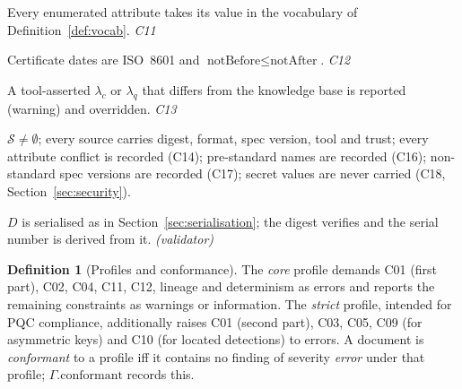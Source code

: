 \documentclass[11pt,a4paper]{article}
\newcommand{\Srcs}{\mathcal{S}}
\theoremstyle{definition}
\newtheorem{definition}{Definition}[section]
\theoremstyle{plain}
\begin{document}
\setcounter{constraint}{10}
\begin{constraint}
Every enumerated attribute takes its value in the vocabulary of Definition~\ref{def:vocab}. \hfill\emph{C11}
\end{constraint}
\setcounter{constraint}{11}
\begin{constraint}
Certificate dates are ISO~8601 and $\text{notBefore} \le \text{notAfter}$. \hfill\emph{C12}
\end{constraint}
\setcounter{constraint}{12}
\begin{constraint}
A tool-asserted $\lambda_c$ or $\lambda_q$ that differs from the knowledge base is reported
(warning) and overridden. \hfill\emph{C13}
\end{constraint}
\setcounter{constraint}{13}
\begin{constraint}[Lineage]
$\Srcs \ne \emptyset$; every source carries digest, format, spec version, tool and trust; every
attribute conflict is recorded (C14); pre-standard names are recorded (C16); non-standard spec
versions are recorded (C17); secret values are never carried (C18, Section~\ref{sec:security}).
\end{constraint}
\setcounter{constraint}{20}
\begin{constraint}[Determinism]
$D$ is serialised as in Section~\ref{sec:serialisation}; the digest verifies and the serial
number is derived from it. \hfill\emph{(validator)}
\end{constraint}

\begin{definition}[Profiles and conformance]
The \emph{core} profile demands C01 (first part), C02, C04, C11, C12, lineage and determinism as
errors and reports the remaining constraints as warnings or information. The \emph{strict}
profile, intended for PQC compliance, additionally raises C01 (second part), C03, C05, C09 (for
asymmetric keys) and C10 (for located detections) to errors. A document is \emph{conformant}
to a profile iff it contains no finding of severity \emph{error} under that profile;
$\Gamma.\text{conformant}$ records this.
\end{definition}
\end{document}
